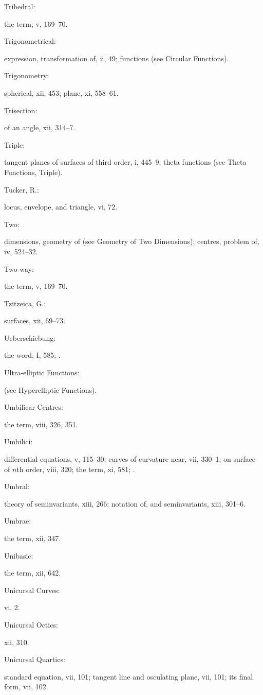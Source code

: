 \documentclass[11pt,a4paper]{book}
\providecommand{\V}[1]{#1}
\providecommand{\IndexEntry}[2]{#1\dotfill #2\par}
\begin{document}
\IndexEntry{Trihedral}: the term, \V{v}, 169--70.

\IndexEntry{Trigonometrical}: expression, transformation of, \V{ii}, 49; functions (see Circular Functions).

\IndexEntry{Trigonometry}: spherical, \V{xii}, 453; plane, \V{xi}, 558--61.

\IndexEntry{Trisection}: of an angle, \V{xii}, 314--7.

\IndexEntry{Triple}: tangent planes of surfaces of third order, \V{i}, 445--9; theta functions (see Theta Functions, Triple).

\IndexEntry{Tucker, R.}: locus, envelope, and triangle, \V{vi}, 72.

\IndexEntry{Two}: dimensions, geometry of (see Geometry of Two Dimensions); centres, problem of, \V{iv}, 524--32.

\IndexEntry{Two-way}: the term, \V{v}, 169--70.

\newpage

\setcounter{page}{130}

\IndexEntry{Tzitzeica, G.}: surfaces, \V{xii}, 69--73.

\IndexEntry{Ueberschiebung}: the word, \V{I}, 585; .

\IndexEntry{Ultra-elliptic Functions}: (see Hyperelliptic Functions).

\IndexEntry{Umbilicar Centres}: the term, \V{viii}, 326, 351.

\IndexEntry{Umbilici}: differential equations, \V{v}, 115--30; curves of curvature near, \V{vii}, 330--1; on surface of $n$th order, \V{viii}, 320; the term, \V{xi}, 581; .

\IndexEntry{Umbral}: theory of seminvariants, \V{xiii}, 266; notation of, and seminvariants, \V{xiii}, 301--6.

\IndexEntry{Umbrae}: the term, \V{xii}, 347.

\IndexEntry{Unibasic}: the term, \V{xii}, 642.

\IndexEntry{Unicursal Curves}: \V{vi}, 2.

\IndexEntry{Unicursal Octics}: \V{xii}, 310.

\IndexEntry{Unicursal Quartics}: standard equation, \V{vii}, 101; tangent line and osculating plane, \V{vii}, 101; its final form, \V{vii}, 102.
\end{document}
